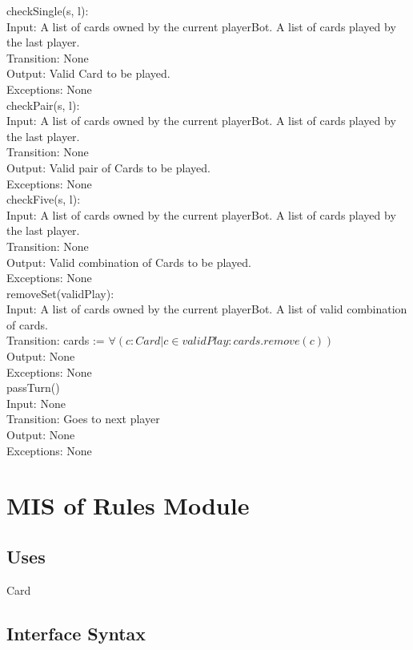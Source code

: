 \documentclass[12pt, titlepage]{article}
\begin{document}
\noindent checkSingle(s, l):\\
Input: A list of cards owned by the current playerBot. A list of cards played by the last player.\\
Transition: None\\
Output: Valid Card to be played. \\
Exceptions: None \\

\noindent checkPair(s, l):\\
Input: A list of cards owned by the current playerBot. A list of cards played by the last player.\\
Transition: None\\
Output: Valid pair of Cards to be played. \\
Exceptions: None \\

\noindent checkFive(s, l):\\
Input: A list of cards owned by the current playerBot. A list of cards played by the last player.\\
Transition: None\\
Output: Valid combination of Cards to be played. \\
Exceptions: None \\

\noindent removeSet(validPlay):\\
Input: A list of cards owned by the current playerBot. A list of valid combination of cards.\\
Transition: cards := $\forall(c : Card|c \in validPlay : cards.remove(c))$\\
Output: None\\
Exceptions: None\\

\noindent passTurn()\\
Input: None\\
Transition: Goes to next player\\
Output: None \\
Exceptions: None \\

\section{MIS of Rules Module}
\subsection{Uses}
Card
\subsection{Interface Syntax}
\end{document}
